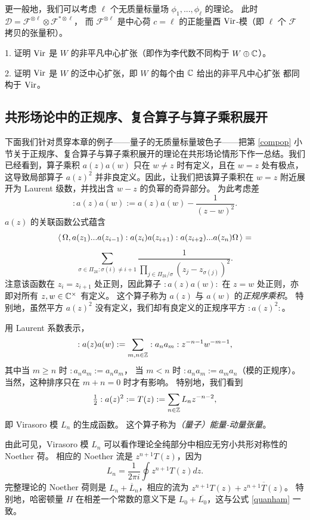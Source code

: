 更一般地，我们可以考虑 $\ell$ 个无质量标量场 $\phi_1,...,\phi_\ell$ 的理论。
此时 $\mathcal D=\mathcal F^{\otimes \ell}\otimes \mathcal F^{*\otimes \ell}$，
而 $\mathcal F^{\otimes \ell}$ 是中心荷 $c=\ell$ 的正能量酉 ${\rm Vir}$-模（即
$\ell$ 个 $\mathcal F$ 拷贝的张量积）。

\begin{exercise} 1. 证明 ${\rm Vir}$ 是 $W$ 的非平凡中心扩张（即作为李代数不同构于 $W\oplus \Bbb C$）。

2. 证明 ${\rm Vir}$ 是 $W$ 的泛中心扩张，即 $W$ 的每个由 $\Bbb C$ 给出的非平凡中心扩张
都同构于 ${\rm Vir}$。
\end{exercise} 

\subsection{共形场论中的正规序、复合算子与算子乘积展开} 

下面我们针对贯穿本章的例子——量子的无质量标量玻色子——把第 \ref{compop} 小节关于正规序、复合算子与算子乘积展开的理论在共形场论情形下作一总结。我们已经看到，算子乘积 $a(z)a(w)$ 只在 $w\ne z$ 时有定义，且在 $w=z$ 处有极点，这导致局部算子 $a(z)^2$ 并非良定义。因此，让我们把该算子乘积在 $w=z$ 附近展开为 Laurent 级数，并找出含 $w-z$ 的负幂的奇异部分。
为此考虑差
$$
:a(z)a(w):=a(z)a(w)-\frac{1}{(z-w)^2}.
$$
$a(z)$ 的关联函数公式蕴含
$$
\la \Omega,a(z_1)...a(z_{i-1}) :a(z_i)a(z_{i+1}): a(z_{i+2})...a(z_n)\Omega\ra=
$$
$$
\sum_{\sigma\in \Pi_{2k}: \sigma(i)\ne i+1}\frac{1}{\prod_{j\in \Pi_{2k}/\sigma}(z_j-z_{\sigma(j)})^2}.
$$
注意该函数在 $z_i=z_{i+1}$ 处正则，因此算子
$:a(z)a(w):$ 在 $z=w$ 处正则，亦即对所有 $z,w\in \Bbb C^\times$ 有定义。
这个算子称为 $a(z)$ 与 $a(w)$ 的\emph{正规序乘积}。
特别地，虽然平方 $a(z)^2$ 没有定义，我们却有良定义的正规序平方 $:a(z)^2:$。

用 Laurent 系数表示，
$$
:a(z)a(w):=\sum_{m,n\in \Bbb Z}:a_na_m:z^{-n-1}w^{-m-1},
$$
其中当 $m\ge n$ 时 $:a_na_m:=a_na_m$，
当 $m<n$ 时 $:a_na_m:=a_ma_n$（模的正规序）。
当然，这种排序只在 $m+n=0$ 时才有影响。
特别地，我们看到
$$
\tfrac{1}{2}:a(z)^2:=T(z):=\sum_{n\in \Bbb Z}L_nz^{-n-2},
$$
即 Virasoro 模 $L_n$ 的生成函数。
这个算子称为\emph{（量子）能量-动量张量}。

由此可见，Virasoro 模 $L_n$ 可以看作理论全纯部分中相应无穷小共形对称性的 Noether 荷。
相应的 Noether 流是 $z^{n+1}T(z)$，因为
$$
L_n=\frac{1}{2\pi i}\oint z^{n+1}T(z)dz.
$$
完整理论的 Noether 荷则是 $L_n+ \overline L_n$，相应的流为 $z^{n+1}T(z)+\overline{z^{n+1}T(z)}$。
特别地，哈密顿量 $H$ 在相差一个常数的意义下是
$L_0+\overline{L_0}$，这与公式 \eqref{quanham} 一致。

